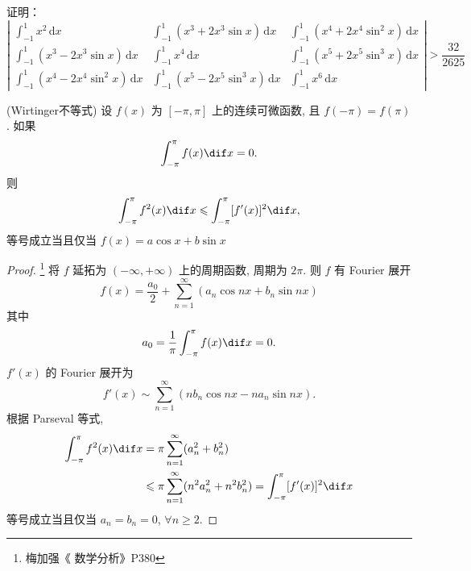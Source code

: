 \documentclass[color=green,titlestyle=hang]{elegantbook}%
\begin{document}
\begin{exercise}
证明：\begin{equation*}
\left|\begin{array}{lll}
\int_{-1}^{1}x^2\,\mathrm{d}x&\int_{-1}^{1}(x^3+2x^3\sin x)\,\mathrm{d}x &\int_{-1}^{1}(x^4+2x^4\sin^2x)\,\mathrm{d}x \\[4mm]
\int_{-1}^{1}(x^3-2x^3\sin x)\,\mathrm{d}x&\int_{-1}^{1}x^4\,\mathrm{d}x &\int_{-1}^{1}(x^5+2x^5\sin^3x)\,\mathrm{d}x\\[4mm]
\int_{-1}^{1}(x^4-2x^4\sin^2x)\,\mathrm{d}x&\int_{-1}^{1}(x^5-2x^5\sin^3x)\,\mathrm{d}x&\int_{-1}^{1}x^6\,\mathrm{d}x
\end{array}\right|>\frac{32}{2625}
\end{equation*}	
\end{exercise}\begin{Solution}
\end{Solution}

\begin{example}\label{Wirtingerintneq-fourier}
(Wirtinger不等式)  设 $f(x)$ 为 $[-\pi,\pi]$ 上的连续可微函数, 且
$f(-\pi)=f(\pi)$. 如果
\[\int_{-\pi}^{\pi}f(x)\dif x=0. \]
则
\[\int_{-\pi}^{\pi}f^2(x)\dif x\leqslant\int_{-\pi}^{\pi}[f'(x)]^2\dif x,\]
等号成立当且仅当 $f(x)=a\cos x+b\sin x$
\end{example}\begin{proof}\footnote{梅加强《 数学分析》P380 }
将 $f$ 延拓为 $(-\infty,+\infty)$ 上的周期函数, 周期为 $2\pi$. 则 $f$ 有 Fourier 展开
\[f(x)=\frac{a_0}{2}+\sum_{n=1}^{\infty}(a_n\cos nx+b_n\sin n x)\]
其中
\[a_0=\frac{1}{\pi}\int_{-\pi}^{\pi}f(x)\dif x=0.\]
$f'(x)$ 的 Fourier 展开为
\[f'(x)\sim\sum_{n=1}^{\infty}(nb_n\cos nx-na_n\sin nx).\]
根据 Parseval 等式,
\begin{align*}
\int_{-\pi}^{\pi} f^2(x)\dif x 
&=\pi\sum_{n=1}^{\infty}(a_n^2+b_n^2)\\ 
& \leqslant\pi\sum_{n=1}^{\infty}(n^2a_n^2+n^2 b_n^2)=\int_{-\pi}^{\pi}[f^{\prime}(x)]^2\dif x 
\end{align*}
等号成立当且仅当 $a_n=b_n=0$, $\forall n\geqslant2$.
\end{proof}
\end{document}
